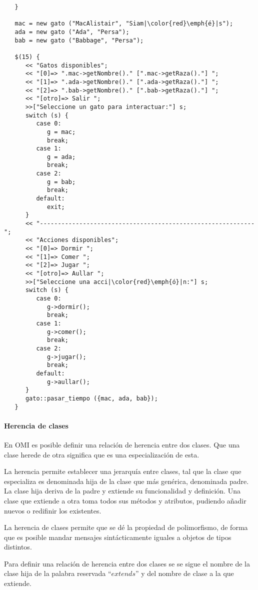 \begin{lstlisting}
   }

   mac = new gato ("MacAlistair", "Siam|\color{red}\emph{é}|s"); 
   ada = new gato ("Ada", "Persa"); 
   bab = new gato ("Babbage", "Persa"); 

   $(15) {
      << "Gatos disponibles";
      << "[0]=> ".mac->getNombre()." [".mac->getRaza()."] ";
      << "[1]=> ".ada->getNombre()." [".ada->getRaza()."] ";
      << "[2]=> ".bab->getNombre()." [".bab->getRaza()."] ";
      << "[otro]=> Salir ";
      >>["Seleccione un gato para interactuar:"] s;
      switch (s) {
         case 0: 
            g = mac;
            break;
         case 1: 
            g = ada;
            break;
         case 2:
            g = bab;
            break;
         default:
            exit;
      }
      << "------------------------------------------------------------";
      << "Acciones disponibles";
      << "[0]=> Dormir ";
      << "[1]=> Comer ";
      << "[2]=> Jugar ";
      << "[otro]=> Aullar ";
      >>["Seleccione una acci|\color{red}\emph{ó}|n:"] s;
      switch (s) {
         case 0: 
            g->dormir();
            break;
         case 1: 
            g->comer();
            break;
         case 2:
            g->jugar();
            break;
         default:
            g->aullar();
      }
      gato::pasar_tiempo ({mac, ada, bab});
   }
\end{lstlisting}

\paragraph{Herencia de clases}


En OMI es posible definir una relación de herencia entre dos clases. Que una clase herede de otra significa 
que es una especialización de esta.  

La herencia permite establecer una jerarquía entre clases, tal que la clase que especializa es denominada 
hija de la clase que más genérica, denominada padre. La clase hija deriva de la padre y extiende su funcionalidad y definición.
Una clase que extiende a otra toma todos sus métodos y atributos, pudiendo añadir nuevos o redifinir los existentes.

La herencia de clases permite que se dé la propiedad de polimorfismo, de forma que 
es posible mandar mensajes sintácticamente iguales a objetos de tipos distintos.

Para definir una relación de herencia entre dos clases se se sigue el nombre de la clase hija de la palabra 
reservada ``$extends$'' y del nombre de clase a la que extiende. \\



